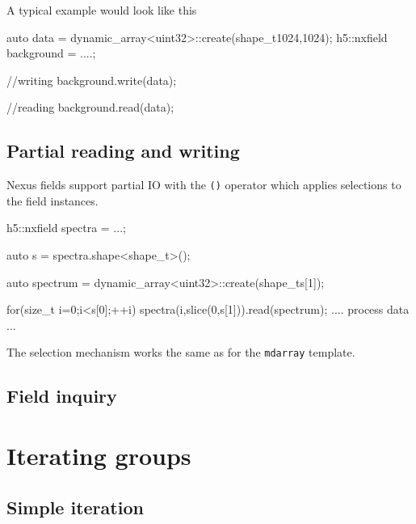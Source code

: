 A typical example would look like this
\begin{cppcode}
auto data = dynamic_array<uint32>::create(shape_t{1024,1024});
h5::nxfield background = ....;

//writing
background.write(data);

//reading
background.read(data);
\end{cppcode}

\subsection{Partial reading and writing}

Nexus fields support partial IO with the {\tt ()} operator which applies
selections to the field instances. 
\begin{cppcode}
h5::nxfield spectra = ...;

auto s = spectra.shape<shape_t>();

auto spectrum = dynamic_array<uint32>::create(shape_t{s[1]});

for(size_t i=0;i<s[0];++i)
{
    spectra(i,slice(0,s[1])).read(spectrum);
    .... process data ...
}
\end{cppcode}
The selection mechanism works the same as for the {\tt mdarray} template. 

\subsection{Field inquiry}

\section{Iterating groups}\label{section:group_iteration}

\subsection{Simple iteration}


